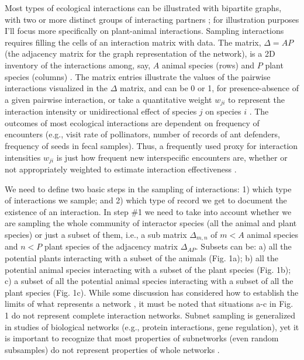 \documentclass[12pt]{article}
\begin{document}
Most types of ecological interactions can be illustrated with bipartite graphs, with two or more distinct groups of interacting partners \citep{Bascompte:2014to}; for illustration purposes I'll focus more specifically on plant-animal interactions. Sampling interactions requires filling the cells of an interaction matrix with data. The matrix, $\Delta= AP$ (the adjacency matrix for the graph representation of the network), is a 2D inventory of the interactions among, say, $A$ animal species (rows) and $P$ plant species (columns) \citep{E31/2562,Bascompte:2014to}. The matrix entries illustrate the values of the pairwise interactions visualized in the $\Delta$ matrix, and can be 0 or 1, for presence-absence of a given pairwise interaction, or take a quantitative weight $w_{ji}$ to represent the interaction intensity or unidirectional effect of species $j$ on species $i$ \citep{Bascompte:2014to,Vazquez:2015ec}. The outcomes of most ecological interactions are dependent on frequency of encounters (e.g., visit rate of pollinators, number of records of ant defenders, frequency of seeds in fecal samples). Thus, a frequently used proxy for interaction intensities $w_{ji}$ is just how frequent new interspecific encounters are, whether or not appropriately weighted to estimate interaction effectiveness \citep{Vazquez:2005}. 

We need to define two basic steps in the sampling of interactions: 1) which type of interactions we sample; and 2) which type of record we get to document the existence of an interaction. In step \#1 we need to take into account whether we are sampling the whole community of interactor species (all the animal and plant species) or just a subset of them, i.e., a sub matrix $\Delta_{m,n}$ of $m < A$ animal species and $n <  P$ plant species of the adjacency matrix $\Delta_{AP}$. Subsets can be: a) all the potential plants interacting with a subset of the animals (Fig. 1a); b) all the potential animal species interacting with a subset of the plant species (Fig. 1b); c) a subset of all the potential animal species interacting with a subset of all the plant species (Fig. 1c). While some discussion has considered how to establish the limits of what represents a network \citep{Strogatz:2001wc} \citep[in analogy to discussion on food-web limits;][]{Cohen:1978}, it must be noted that situations a-c in Fig. 1 do not represent complete interaction networks. Subnet sampling is generalized in studies of biological networks (e.g., protein interactions, gene regulation), yet it is important to recognize that most properties of subnetworks (even random subsamples) do not represent properties of whole networks \citep{Stumpf:2005tn}. 
\end{document}
